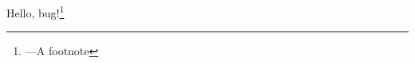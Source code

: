 \documentclass{article}
\begin{document}
\cbstart 
Hello, bug!\footnote{---\cbstart A footnote\cbend}
\cbend
\end{document}
